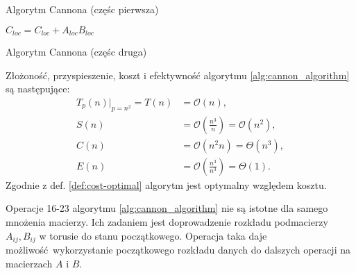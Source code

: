 \begin{algorithm}[h]
\centering
\begin{algorithmic}[1]
\item[]
 
\EndFor
{}
\EndFor
{}
\end{algorithmic}
\caption{Algorytm Cannona\cite{Golub} (częśc pierwsza)}
\end{algorithm}

\begin{algorithm}[h]
\ContinuedFloat
\centering
\begin{algorithmic}[1]
 
	\State \(C_{loc}=C_{loc} + A_{loc}B_{loc}\)
\EndFor
{} 
	 
\EndFor
{}
\EndFor
\end{algorithmic}
\caption{Algorytm Cannona\cite{Golub} (częśc druga)}
\label{alg:cannon_algorithm}
\end{algorithm}

Złożoność, przyspieszenie, koszt i efektywność algorytmu \ref{alg:cannon_algorithm} są następujące\cite{Czech}:
\begin{align*}
T_p(n)|_{p=n^2} = T(n) &= \mathcal{O}(n), \\
S(n) &= \mathcal{O}(\frac{n^3}{n}) = \mathcal{O}(n^2), \\
C(n) &= \mathcal{O}(n^2n)=\Theta(n^3), \\
E(n) &= \mathcal{O}(\frac{n^3}{n^3})=\Theta(1).
\end{align*}
Zgodnie z def. \ref{def:cost-optimal} algorytm jest optymalny względem kosztu.

Operacje 16-23 algorytmu \ref{alg:cannon_algorithm} nie są istotne dla samego mnożenia macierzy. Ich zadaniem jest doprowadzenie rozkładu podmacierzy \(A_{ij}, B_{ij}\) w torusie do stanu początkowego. Operacja taka daje możliwość wykorzystanie początkowego rozkładu danych do dalszych operacji na macierzach \(A\) i \(B\).